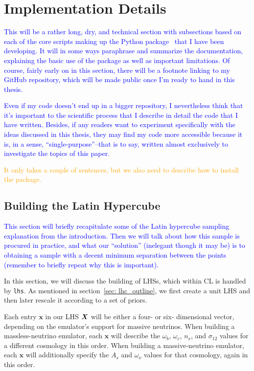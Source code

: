 \chapter{Implementation Details}
\label{chap: implementation}

\textcolor{blue}{This will be a rather long, dry, and technical section with 
subsections based on each of the core scripts making up the Python package \
that I have been developing. It will in some ways paraphrase and summarize the 
documentation, explaining the basic use of the package as well as important 
limitations. Of course, fairly early on in this section, there will be a 
footnote linking to my GitHub repository, which will be made public once I'm 
ready to hand in this thesis.}

\textcolor{blue}{Even if my code doesn't end up in a bigger repository, I 
nevertheless think that it's important to the scientific process that I 
describe in detail the code that I have written. Besides, if any readers want 
to experiment specifically with the ideas discussed in this thesis, they may 
find my code more accessible because it is, in a sense, ``single-purpose''--that 
is to say, written almost exclusively to investigate the topics of this 
paper.}

\textcolor{orange}{It only takes a couple of sentences, but we also need to 
describe how to install the package.}

\section{Building the Latin Hypercube}
\label{sec: build_lhc}


\textcolor{blue}{This section will briefly recapitulate some of the Latin hypercube sampling
explanation from the introduction. Then we will talk about how this sample is
procured in practice, and what our ``solution'' (inelegant though it may be)
is to obtaining a sample with a decent minimum separation between the points
(remember to briefly repeat why this is important).}

In this section, we will discuss the building of LHSs, which within CL is 
handled by \verb|lhs|. As mentioned in section~\ref{sec: lhc_outline},
we first create a unit LHS and then later rescale it according to a set of
priors.

Each entry $\bm{x}$ in our LHS $\bm{X}$ will be either a four- or six-
dimensional vector, 
depending on the emulator's support for massive neutrinos. When building a
massless-neutrino emulator, each $\bm{x}$ will describe the $\omega_b$,
$\omega_c$, $n_s$, and $\sigma_{12}$ values for a different cosmology in 
this order. When building a massive-neutrino emulator, each $\bm{x}$ will 
additionally specify the $A_s$ and $\omega_\nu$ values for that cosmology, 
again in this order.

